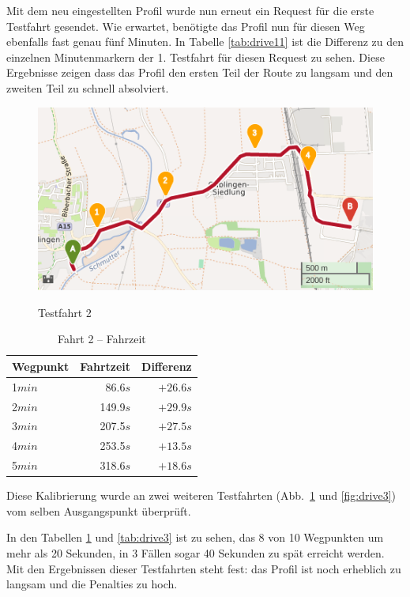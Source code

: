Mit dem neu eingestellten Profil wurde nun erneut ein Request für die erste Testfahrt gesendet.
Wie erwartet, benötigte das Profil nun für diesen Weg ebenfalls fast genau fünf Minuten.
In Tabelle \ref{tab:drive11} ist die Differenz zu den einzelnen Minutenmarkern der 1. Testfahrt für diesen Request zu sehen.
Diese Ergebnisse zeigen dass das Profil den ersten Teil der Route zu langsam und den zweiten Teil zu schnell absolviert.

\begin{figure}[htb]
\centering
\caption{Testfahrt 2}
\label{fig:drive2}
\includegraphics[width = 0.70 \textwidth]{../media/Fahrt2crop.png} \\
\end{figure}

\begin{table}[htb]
\centering
\caption{Fahrt 2 -- Fahrzeit}
\label{tab:drive2}
\begin{tabular}{|l|r|r|}
\hline
Wegpunkt & Fahrtzeit & Differenz \\ \hline 
1$min$ & 86.6$s$ & $+26.6s$ \\
2$min$ & 149.9$s$ & $+29.9s$ \\
3$min$ & 207.5$s$ & $+27.5s$ \\
4$min$ & 253.5$s$ & $+13.5s$ \\
5$min$ & 318.6$s$ & $+18.6s$ \\
\hline
\end{tabular}
\end{table}


Diese Kalibrierung wurde an zwei weiteren Testfahrten (Abb.~\ref{fig:drive2} und \ref{fig:drive3}) vom selben Ausgangspunkt überprüft.

In den Tabellen \ref{tab:drive2} und \ref{tab:drive3} ist zu sehen, das 8 von 10 Wegpunkten um mehr als 20 Sekunden, in 3 Fällen sogar 40 Sekunden zu spät erreicht werden.
Mit den Ergebnissen dieser Testfahrten steht fest: das Profil ist noch erheblich zu langsam und die Penalties zu hoch.


